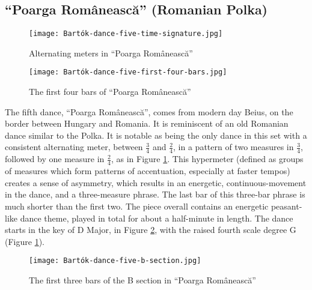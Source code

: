 \subsection{``Poarga Românească'' (Romanian Polka)}

\begin{figure}
  \centering
  \texttt{[image: Bartók-dance-five-time-signature.jpg]}
  \caption[The alternating meters in ``Poarga Românească'' of Bartók's \textit{Romanian Folk Dances, Sz. 56, BB 68}]{Alternating meters in ``Poarga Românească''}
  \label{fig:Bartók-dance-five-time-signature}
\end{figure}

\begin{figure}
  \centering
  \texttt{[image: Bartók-dance-five-first-four-bars.jpg]}
  \caption{The first four bars of ``Poarga Românească''}
  \label{fig:Bartók-dance-five-first-four-bars}
\end{figure}


The fifth dance, ``Poarga Românească'', comes from modern day Beius, on the border between Hungary and Romania. It is reminiscent of an old Romanian dance similar to the Polka. It is notable as being the only dance in this set with a consistent alternating meter, between $\frac{3}{4}$ and $\frac{2}{4}$, in a pattern of two measures in $\frac{3}{4}$, followed by one measure in $\frac{2}{4}$, as in Figure \ref{fig:Bartók-dance-five-time-signature}\autocite{Lung_2016}. This hypermeter (defined as groups of measures which form patterns of accentuation, especially at faster tempos\autocite{Hughes_Gotham_Hamm_2021}) creates a sense of asymmetry, which results in an energetic, continuous-movement in the dance, and a three-measure phrase. The last bar of this three-bar phrase is much shorter than the first two. The piece overall contains an energetic peasant-like dance theme, played in total for about a half-minute in length. The dance starts in the key of D Major, in Figure \ref{fig:Bartók-dance-five-first-four-bars}\autocite{Lung_2016}, with the raised fourth scale degree G\musSharp{} (Figure \ref{fig:Bartók-dance-five-time-signature}\autocite{Lung_2016}).

\begin{figure}
  \centering
  \texttt{[image: Bartók-dance-five-b-section.jpg]}
  \caption[The first three bars in the B section of ``Poarga Românească'' in Bartók's \textit{Romanian Folk Dances, Sz. 56, BB 68}]{The first three bars of the B section in ``Poarga Românească''}
  \label{fig:Bartók-dance-five-b-section}
\end{figure}


